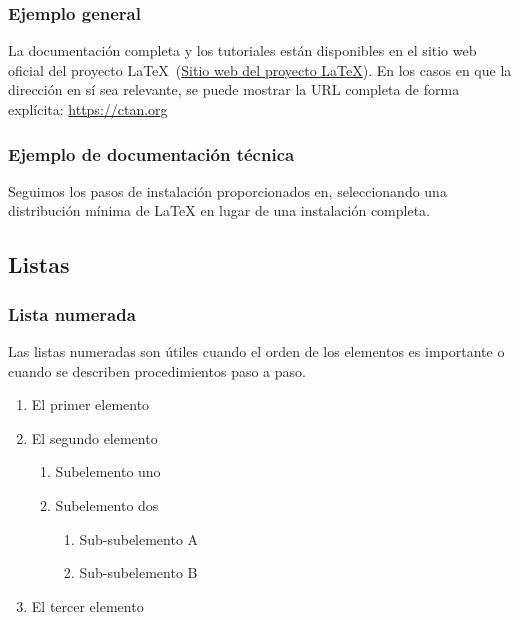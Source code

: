 \subsubsection{Ejemplo general}
La documentación completa y los tutoriales están disponibles en el sitio web oficial del proyecto \LaTeX\ (\href{https://www.latex-project.org}{Sitio web del proyecto LaTeX}). En los casos en que la dirección en sí sea relevante, se puede mostrar la URL completa de forma explícita:
\url{https://ctan.org}


\subsubsection{Ejemplo de documentación técnica}
Seguimos los pasos de instalación proporcionados en, seleccionando una distribución mínima de \LaTeX{} en lugar de una instalación completa.





\subsection{Listas}

\subsubsection{Lista numerada}

Las listas numeradas son útiles cuando el orden de los elementos es importante o cuando se describen procedimientos paso a paso.

\begin{enumerate}
	\item El primer elemento
	\item El segundo elemento
	\begin{enumerate}
		\item Subelemento uno
		\item Subelemento dos
		\begin{enumerate}
			\item Sub-subelemento A
			\item Sub-subelemento B
		\end{enumerate}
	\end{enumerate}
	\item El tercer elemento
\end{enumerate}


